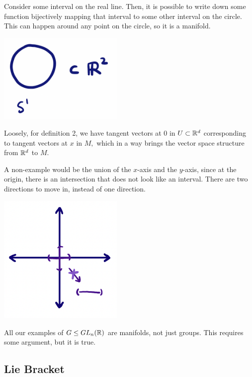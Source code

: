 \begin{example}[Circle]

Consider some interval on the real line. Then, it is possible to write down some function bijectively mapping that interval to some other interval on the circle. This can happen around any point on the circle, so it is a manifold.

\begin{center}
    \includegraphics[width=6cm]{Lecture Files and Images/lec33-circol.png}
\end{center}
\end{example}

Loosely, for definition 2, we have tangent vectors at $0$ in $U \subset \mathbb R^d$ corresponding to tangent vectors at $x$ in $M,$ which in a way brings the vector space structure from $\mathbb R^d$ to $M.$ 

A non-example would be the union of the $x$-axis and the $y$-axis, since at the origin, there is an intersection that does not look like an interval. There are two directions to move in, instead of one direction. 

\begin{center}
    \includegraphics[width=6cm]{Lecture Files and Images/lec33-3.png}
\end{center}


All our examples of $G \leq GL_n(\mathbb R)$ are manifolds, not just groups. This requires some argument, but it is true. 

\subsection{Lie Bracket}

